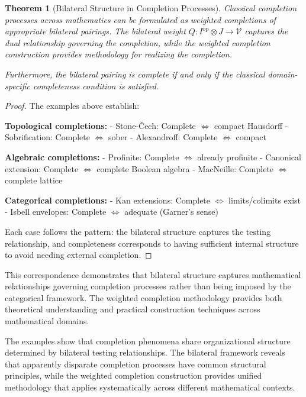 \documentclass[11pt]{article}
\theoremstyle{plain}
\newtheorem{theorem}{Theorem}[section]
\theoremstyle{definition}
\theoremstyle{remark}
\newcommand{\V}{\mathcal{V}}
\newcommand{\op}{\mathrm{op}}
\begin{document}
\begin{theorem}[Bilateral Structure in Completion Processes]\label{thm:bilateral-examples-summary}
Classical completion processes across mathematics can be formulated as weighted completions of appropriate bilateral pairings. The bilateral weight $Q : I^{\op} \otimes J \to \V$ captures the dual relationship governing the completion, while the weighted completion construction provides methodology for realizing the completion.

Furthermore, the bilateral pairing is complete if and only if the classical domain-specific completeness condition is satisfied.
\end{theorem}

\begin{proof}
The examples above establish:

\textbf{Topological completions:}
- Stone-\v{C}ech: Complete $\Leftrightarrow$ compact Hausdorff
- Sobrification: Complete $\Leftrightarrow$ sober
- Alexandroff: Complete $\Leftrightarrow$ compact

\textbf{Algebraic completions:}
- Profinite: Complete $\Leftrightarrow$ already profinite  
- Canonical extension: Complete $\Leftrightarrow$ complete Boolean algebra
- MacNeille: Complete $\Leftrightarrow$ complete lattice

\textbf{Categorical completions:}
- Kan extensions: Complete $\Leftrightarrow$ limits/colimits exist
- Isbell envelopes: Complete $\Leftrightarrow$ adequate (Garner's sense)

Each case follows the pattern: the bilateral structure captures the testing relationship, and completeness corresponds to having sufficient internal structure to avoid needing external completion.
\end{proof}

This correspondence demonstrates that bilateral structure captures mathematical relationships governing completion processes rather than being imposed by the categorical framework. The weighted completion methodology provides both theoretical understanding and practical construction techniques across mathematical domains.

The examples show that completion phenomena share organizational structure determined by bilateral testing relationships. The bilateral framework reveals that apparently disparate completion processes have common structural principles, while the weighted completion construction provides unified methodology that applies systematically across different mathematical contexts.
\end{document}
